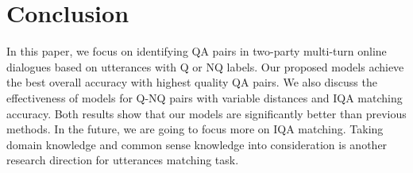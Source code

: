\section{Conclusion}
\label{sec:conclusion}
In this paper, we focus on identifying QA pairs in two-party multi-turn online dialogues based on utterances with Q or NQ labels. Our proposed models achieve the best overall accuracy with highest quality QA pairs. We also discuss the effectiveness of models for Q-NQ pairs with variable distances and IQA matching accuracy. Both results show that our models are significantly better than previous methods. In the future, we are going to focus more on IQA matching. Taking domain knowledge and common sense knowledge into consideration is another research direction for utterances matching task.